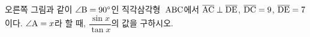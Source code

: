 \noindent\begin{minipage}[t]{0.58\linewidth}\vspace{0pt}\raggedright 오른쪽 그림과 같이 $\angle\mathrm{B}=90^\circ$인 직각삼각형~$\mathrm{ABC}$에서 $\overline{\mathrm{AC}}\perp\overline{\mathrm{DE}}$, $\overline{\mathrm{DC}}=9$, $\overline{\mathrm{DE}}=7$이다. $\angle\mathrm{A}=x$라 할 때, $\dfrac{\sin x}{\tan x}$의 값을 구하시오.\end{minipage}\hfill\begin{minipage}[t]{0.4\linewidth}\vspace{0pt}\centering \resizebox{\ifdim\width>\linewidth\linewidth\else\width\fi}{!}{}\end{minipage}\par
